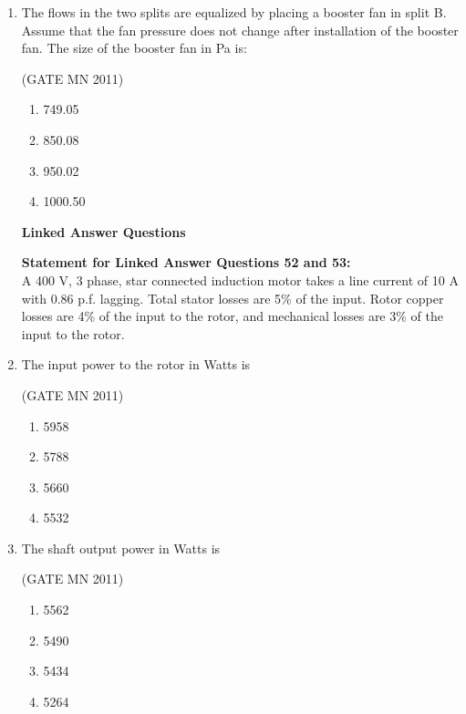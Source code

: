 \documentclass[journal]{IEEEtran}
\begin{document}
\begin{enumerate}
\item The flows in the two splits are equalized by placing a booster fan in split B. Assume that the fan pressure does not change after installation of the booster fan. The size of the booster fan in Pa is:  

	\hfill(GATE MN 2011)

\begin{multicols}{4}
\begin{enumerate}
\item 749.05  
\item 850.08  
\item 950.02  
\item 1000.50  
\end{enumerate}
\end{multicols}


\textbf{Linked Answer Questions}


\textbf{Statement for Linked Answer Questions 52 and 53:}\\
A 400 V, 3 phase, star connected induction motor takes a line current of 10 A with 0.86 p.f. lagging. Total stator losses are 5\% of the input. Rotor copper losses are 4\% of the input to the rotor, and mechanical losses are 3\% of the input to the rotor.



\item The input power to the rotor in Watts is

	\hfill(GATE MN 2011)
\begin{multicols}{4}
\begin{enumerate}
\item 5958  
\item 5788  
\item 5660  
\item 5532  
\end{enumerate}
\end{multicols}

\item The shaft output power in Watts is

	\hfill(GATE MN 2011)
\begin{multicols}{4}
\begin{enumerate}
\item 5562  
\item 5490  
\item 5434  
\item 5264  
\end{enumerate}
\end{multicols}




\end{enumerate}
\end{document}
